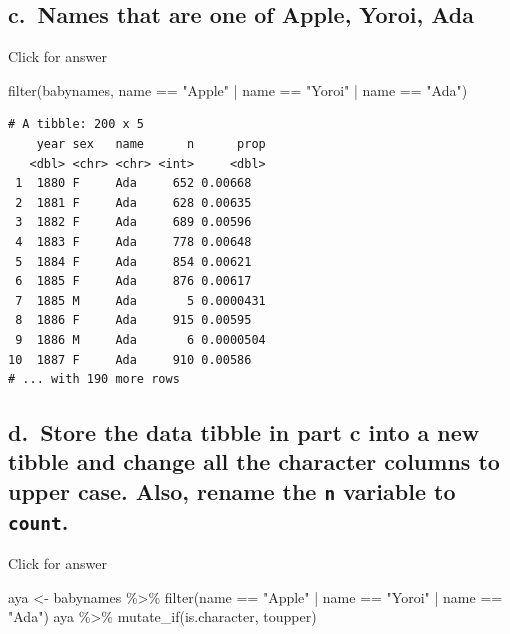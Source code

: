 \documentclass[
]{book}
\newenvironment{Shaded}{\begin{snugshade}}{\end{snugshade}}
\newcommand{\FunctionTok}[1]{\textcolor[rgb]{0.00,0.00,0.00}{#1}}
\newcommand{\NormalTok}[1]{#1}
\newcommand{\OtherTok}[1]{\textcolor[rgb]{0.56,0.35,0.01}{#1}}
\newcommand{\SpecialCharTok}[1]{\textcolor[rgb]{0.00,0.00,0.00}{#1}}
\newcommand{\StringTok}[1]{\textcolor[rgb]{0.31,0.60,0.02}{#1}}
\begin{document}
\hypertarget{c.-names-that-are-one-of-apple-yoroi-ada}{%
\subsection{c.~Names that are one of Apple, Yoroi, Ada}\label{c.-names-that-are-one-of-apple-yoroi-ada}}

Click for answer

\begin{Shaded}
\begin{Highlighting}[]
\FunctionTok{filter}\NormalTok{(babynames, name }\SpecialCharTok{==} \StringTok{"Apple"} \SpecialCharTok{|}\NormalTok{ name }\SpecialCharTok{==} \StringTok{"Yoroi"} \SpecialCharTok{|}\NormalTok{ name }\SpecialCharTok{==} \StringTok{"Ada"}\NormalTok{)}
\end{Highlighting}
\end{Shaded}

\begin{verbatim}
# A tibble: 200 x 5
    year sex   name      n      prop
   <dbl> <chr> <chr> <int>     <dbl>
 1  1880 F     Ada     652 0.00668  
 2  1881 F     Ada     628 0.00635  
 3  1882 F     Ada     689 0.00596  
 4  1883 F     Ada     778 0.00648  
 5  1884 F     Ada     854 0.00621  
 6  1885 F     Ada     876 0.00617  
 7  1885 M     Ada       5 0.0000431
 8  1886 F     Ada     915 0.00595  
 9  1886 M     Ada       6 0.0000504
10  1887 F     Ada     910 0.00586  
# ... with 190 more rows
\end{verbatim}

\hypertarget{d.-store-the-data-tibble-in-part-c-into-a-new-tibble-and-change-all-the-character-columns-to-upper-case.-also-rename-the-n-variable-to-count.}{%
\subsection{\texorpdfstring{d.~Store the data tibble in part c into a new tibble and change all the character columns to upper case. Also, rename the \texttt{n} variable to \texttt{count}.}{d.~Store the data tibble in part c into a new tibble and change all the character columns to upper case. Also, rename the n variable to count.}}\label{d.-store-the-data-tibble-in-part-c-into-a-new-tibble-and-change-all-the-character-columns-to-upper-case.-also-rename-the-n-variable-to-count.}}

Click for answer

\begin{Shaded}
\begin{Highlighting}[]
\NormalTok{aya }\OtherTok{\textless{}{-}}\NormalTok{ babynames }\SpecialCharTok{\%\textgreater{}\%} \FunctionTok{filter}\NormalTok{(name }\SpecialCharTok{==} \StringTok{"Apple"} \SpecialCharTok{|}\NormalTok{ name }\SpecialCharTok{==} \StringTok{"Yoroi"} \SpecialCharTok{|}\NormalTok{ name }\SpecialCharTok{==} \StringTok{"Ada"}\NormalTok{)}
\NormalTok{aya }\SpecialCharTok{\%\textgreater{}\%} \FunctionTok{mutate\_if}\NormalTok{(is.character, toupper)}
\end{Highlighting}
\end{Shaded}
\end{document}
